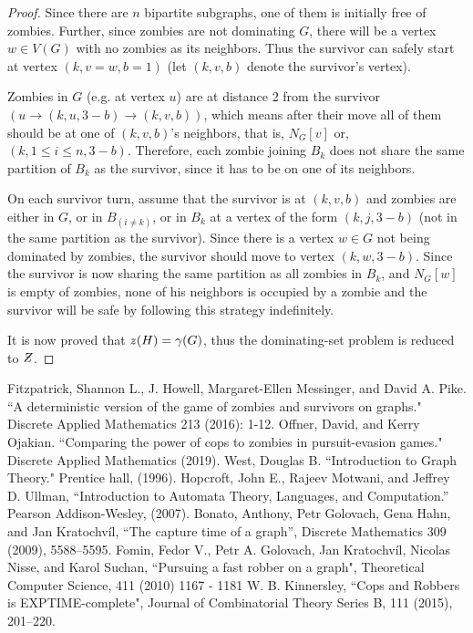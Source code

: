 \documentclass[1p]{elsarticle}
\newcommand{\NPZ}{\ooalign{$Z$\cr\hfil\rule[.8ex]{.3em}{.09ex}\hfil\cr}}
\newcommand{\zn}{\ooalign{$z$\cr\hfil\rule[.5ex]{.2em}{.08ex}\hfil\cr}}
\begin{document}
\begin{proof}
		Since there are $n$ bipartite subgraphs, one of them is initially free of zombies. Further, since zombies are
		not dominating $G$, there will be a vertex $w \in V(G)$ with no zombies as its neighbors. Thus the survivor can
		safely start at vertex $(k,v = w,b = 1)$ (let $(k,v,b)$ denote the survivor's vertex).

		Zombies in $G$ (e.g. at vertex $u$) are at distance 2 from the survivor $(u \rightarrow (k,u,3 - b) \rightarrow
		(k,v,b))$, which means after their move all of them should be at one of $(k,v,b)$'s neighbors, that is, $N_G[v]
		$ or, $ (k,1 \leq i \leq n,3 - b)$. Therefore, each zombie joining $B_k$ does not share the same partition of
		$B_k$ as the survivor, since it has to be on one of its neighbors.
		
		On each survivor turn, assume that the survivor is at $(k,v,b)$ and zombies are either in $G$, or in $B_{(i \neq
		k)}$, or in $B_k$ at a vertex of the form $(k,j,3-b)$ (not in the same partition as the survivor). Since there
		is a vertex $w \in G$ not being dominated by zombies, the survivor should move to vertex $(k,w,3-b)$. Since the
		survivor is now sharing the same partition as all zombies in $B_k$, and $N_G[w]$ is empty of zombies, none of
		his neighbors is occupied by a zombie and the survivor will be safe by following this strategy indefinitely.

		It is now proved that $\zn(H) = \gamma(G)$, thus the dominating-set problem is reduced to $\NPZ$.

	\end{proof}
\begin{thebibliography}{999}
	
	Fitzpatrick, Shannon L., J. Howell, Margaret-Ellen Messinger, and David A. Pike. ``A deterministic version of the
	game of zombies and survivors on graphs." Discrete Applied Mathematics 213 (2016): 1-12.
	Offner, David, and Kerry Ojakian. ``Comparing the power of cops to zombies in pursuit-evasion games." Discrete
	Applied Mathematics (2019).
	West, Douglas B. ``Introduction to Graph Theory." Prentice hall, (1996).
	Hopcroft, John E., Rajeev Motwani, and Jeffrey D. Ullman, ``Introduction to Automata Theory, Languages, and
	Computation.'' Pearson Addison-Wesley, (2007).
	Bonato, Anthony, Petr Golovach, Gena Hahn, and Jan Kratochvíl, ``The capture time of a graph'', Discrete Mathematics
	309 (2009), 5588–5595.
	Fomin, Fedor V., Petr A. Golovach, Jan Kratochvíl, Nicolas Nisse, and Karol Suchan, ``Pursuing a fast robber on a
	graph", Theoretical Computer Science, 411 (2010) 1167 - 1181
	W. B. Kinnersley, ``Cops and Robbers is EXPTIME-complete", Journal of Combinatorial Theory Series B, 111 (2015), 201–220.
\end{thebibliography}
	
\end{document}
